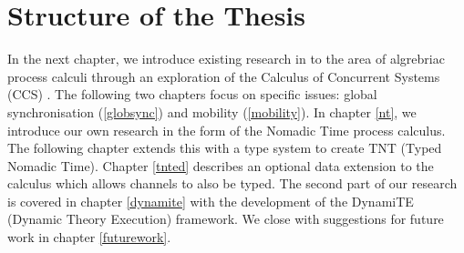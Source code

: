 \section{Structure of the Thesis}

In the next chapter, we introduce existing research in to the area of
algrebriac process calculi through an exploration of the Calculus of
Concurrent Systems (CCS) \cite{milner:ccs}.  The following two
chapters focus on specific issues: global synchronisation
(\ref{globsync}) and mobility (\ref{mobility}).  In chapter \ref{nt},
we introduce our own research in the form of the Nomadic Time process
calculus.  The following chapter extends this with a type system to
create TNT (Typed Nomadic Time).  Chapter \ref{tnted} describes an
optional data extension to the calculus which allows channels to also
be typed.  The second part of our research is covered in chapter
\ref{dynamite} with the development of the DynamiTE (Dynamic Theory
Execution) framework.  We close with suggestions for future work in
chapter \ref{futurework}.
